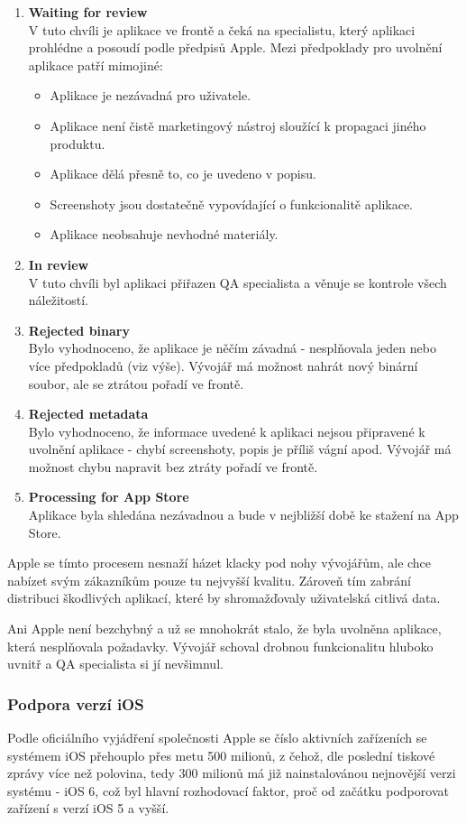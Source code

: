 \begin{enumerate}
\item {\bf Waiting for review}\\
V tuto chvíli je aplikace ve frontě a čeká na specialistu, který aplikaci prohlédne a posoudí podle předpisů Apple. Mezi předpoklady pro uvolnění aplikace patří mimojiné:
	\begin{itemize}
		\item Aplikace je nezávadná pro uživatele.
		\item Aplikace není čistě marketingový nástroj sloužící k propagaci jiného produktu.
		\item Aplikace dělá přesně to, co je uvedeno v popisu.
		\item Screenshoty jsou dostatečně vypovídající o funkcionalitě aplikace.
		\item Aplikace neobsahuje nevhodné materiály.
	\end{itemize}
\item {\bf In review}\\
V tuto chvíli byl aplikaci přiřazen QA specialista a věnuje se kontrole všech náležitostí.
\item {\bf Rejected binary}\\
Bylo vyhodnoceno, že aplikace je něčím závadná - nesplňovala jeden nebo více předpokladů (viz výše). Vývojář má možnost nahrát nový binární soubor, ale se ztrátou pořadí ve frontě.
\item {\bf Rejected metadata}\\
Bylo vyhodnoceno, že informace uvedené k aplikaci nejsou připravené k uvolnění aplikace - chybí screenshoty, popis je příliš vágní apod. Vývojář má možnost chybu napravit bez ztráty pořadí ve frontě.
\item {\bf Processing for App Store}\\
Aplikace byla shledána nezávadnou a bude v nejbližší době ke stažení na App Store.
\end{enumerate}

Apple se tímto procesem nesnaží házet klacky pod nohy vývojářům, ale chce nabízet svým zákazníkům pouze tu nejvyšší kvalitu. Zároveň tím zabrání distribuci škodlivých aplikací, které by shromažďovaly uživatelská citlivá data.

Ani Apple není bezchybný a už se mnohokrát stalo, že byla uvolněna aplikace, která nesplňovala požadavky. Vývojář schoval drobnou funkcionalitu hluboko uvnitř a QA specialista si jí nevšimnul.

\subsubsection*{Podpora verzí iOS}
Podle oficiálního vyjádření společnosti Apple \cite{ENGADGET} se číslo aktivních zařízeních se systémem iOS přehouplo přes metu 500 milionů, z čehož, dle poslední tiskové zprávy \cite{APPPRESS} více než polovina, tedy 300 milionů má již nainstalovánou nejnovější verzi systému - iOS 6, což byl hlavní rozhodovací faktor, proč od začátku podporovat zařízení s verzí iOS 5 a vyšší.

